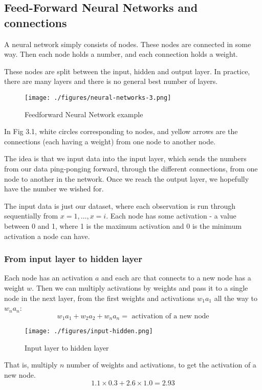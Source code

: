 \subsection{Feed-Forward Neural Networks and connections}
A neural network simply consists of nodes. These nodes are connected in some way. Then each node holds a number, and each connection holds a weight.

These nodes are split between the input, hidden and output layer. In practice, there are many layers and there is no general best number of layers.
\begin{figure}[h]
	\centering
	\texttt{[image: ./figures/neural-networks-3.png]}	
	\caption{Feedforward Neural Network example}
\end{figure}

In Fig 3.1, white circles corresponding to nodes, and yellow arrows are the connections (each having a weight) from one node to another node. 

The idea is that we input data into the input layer, which sends the numbers from our data ping-ponging forward, through the different connections, from one node to another in the network. Once we reach the output layer, we hopefully have the number we wished for.

The input data is just our dataset, where each observation is run through sequentially from $x=1, \dots, x=i$. Each node has some activation - a value between 0 and 1, where 1 is the maximum activation and 0 is the minimum activation a node can have.

\subsubsection{From input layer to hidden layer}
Each node has an activation $a$ and each arc that connects to a new node has a weight $w$. Then we can multiply activations by weights and pass it to a single node in the next layer, from the first weights and activations $w_1a_1$ all the way to $w_na_n$:
$$	w_1a_1 + w_2a_2 + w_na_n = \text{ activation of a new node}$$

\begin{figure}[h]
	\centering
	\texttt{[image: ./figures/input-hidden.png]}	
	\caption{Input layer to hidden layer}
\end{figure}

That is, multiply $n$ number of weights and activations, to get the activation of a new node.
$$
	1.1 \times 0.3 + 2.6 \times 1.0 = 2.93
$$

